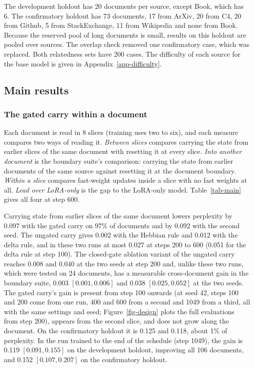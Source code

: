 \documentclass[10pt]{article} %
\begin{document}
The development holdout has 20 documents per source, except Book, which has 6. The confirmatory holdout has 73 documents, 17 from ArXiv, 20 from C4, 20 from Github, 5 from StackExchange, 11 from Wikipedia and none from Book. Because the reserved pool of long documents is small, results on this holdout are pooled over sources. The overlap check removed one confirmatory case, which was replaced. Both relatedness sets have 200 cases. The difficulty of each source for the base model is given in Appendix~\ref{app-difficulty}.

\subsection{Main results}

\subsubsection{The gated carry within a document}
\label{sec-within}

Each document is read in 8 slices (training uses two to six), and each measure compares two ways of reading it. \emph{Between slices} compares carrying the state from earlier slices of the same document with resetting it at every slice. \emph{Into another document} is the boundary suite's comparison: carrying the state from earlier documents of the same source against resetting it at the document boundary. \emph{Within a slice} compares fast-weight updates inside a slice with no fast weights at all. \emph{Lead over LoRA-only} is the gap to the LoRA-only model. Table~\ref{tab-main} gives all four at step 600.

Carrying state from earlier slices of the same document lowers perplexity by 0.097 with the gated carry on 97\% of documents and by 0.092 with the second seed. The ungated carry gives 0.002 with the Hebbian rule and 0.012 with the delta rule, and in these two runs at most 0.027 at steps 200 to 600 (0.051 for the delta rule at step 100). The closed-gate ablation variant of the ungated carry reaches 0.008 and 0.040 at the two seeds at step 200 and, unlike these two runs, which were tested on 24 documents, has a measurable cross-document gain in the boundary suite, 0.003 $[0.001, 0.006]$ and 0.038 $[0.025, 0.052]$ at the two seeds. The gated carry's gain is present from step 100 onwards (at seed 42, steps 100 and 200 come from one run, 400 and 600 from a second and 1049 from a third, all with the same settings and seed; Figure~\ref{fig-design} plots the full evaluations from step 200), appears from the second slice, and does not grow along the document. On the confirmatory holdout it is 0.125 and 0.118, about 1\% of perplexity. In the run trained to the end of the schedule (step 1049), the gain is 0.119 $[0.091, 0.155]$ on the development holdout, improving all 106 documents, and 0.152 $[0.107, 0.207]$ on the confirmatory holdout.
\end{document}
